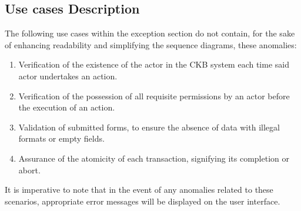 \subsection{Use cases Description}
The following use cases within the exception section do not contain, for the sake of enhancing readability and simplifying the sequence diagrams, these anomalies:
\begin{enumerate}
    \item Verification of the existence of the actor in the CKB system each time said actor undertakes an action.
    \item Verification of the possession of all requisite permissions by an actor before the execution of an action.
    \item Validation of submitted forms, to ensure the absence of data with illegal formats or empty fields.
    \item Assurance of the atomicity of each transaction, signifying its completion or abort.
\end{enumerate}
It is imperative to note that in the event of any anomalies related to these scenarios, appropriate error messages will be displayed on the user interface.


